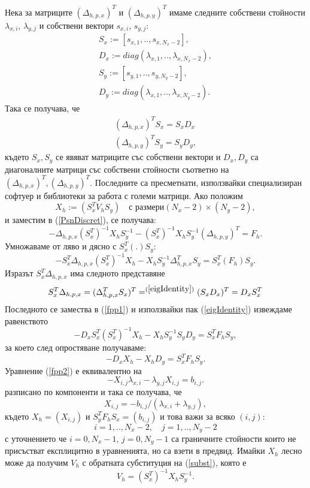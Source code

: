 \documentclass[a4paper]{article}
\newcommand{\be}{\begin{equation}}
\newcommand{\ee}{\end{equation}}
\newcommand{\rf}[1]{(\ref{#1})}
\theoremstyle{remark}
\begin{document}
\begin{large}
Нека за матриците $(\Delta_{h,p,x})^T$ и $(\Delta_{h,p,y})^T$ имаме следните собствени стойности $\lambda_{x,i}$, $\lambda_{y,j}$ и собствени вектори $s_{x,i}$, $s_{y,j}$:
\begin{align}
S_x:=[s_{x,1},..,s_{x,N_x-2}],\\
D_x:= diag(\lambda_{x,1},..,\lambda_{x,N_x-2}),\\
S_y:=[s_{y,1},..,s_{y,N_y-2}],\\
D_y:= diag(\lambda_{x,1},..,\lambda_{x,N_y-2}).
\end{align}
Така се получава, че
\begin{align}\label{eigIdentity}
(\Delta_{h,p,x})^T  S_x = S_x  D_x\nonumber\\
(\Delta_{h,p,y})^T   S_y = S_y  D_y,
\end{align}
където $S_x, S_y$ се явяват матриците със собствени вектори и $D_x, D_y$ са диагоналните матрици със собствени стойности съответно на $(\Delta_{h,p,x})^T, (\Delta_{h,p,y})^T$. Последните са пресметнати, използвайки специализиран софтуер и библиотеки за работа с големи матрици. Ако положим
\be\label{subst}
X_h := ( S_x^T  V_h  S_y ) \quad \text{с размери} (N_x-2)\times(N_y-2),
\ee
и заместим в \rf{PsnDiscret}, се получава:
\be
-\Delta_{h,p,x}  (S_x^T)^{-1} X_h  S_y^{-1}  -(S_x^T)^{-1} X_h  S_y^{-1}  (\Delta_{h,p,y})^T = F_h.
\ee
Умножаваме от ляво и дясно с $ S_x^T  ( . )  S_y$:
\be\label{fpp1}
- S_x^T \Delta_{h,p,x} (S_x^T)^{-1} X_h -X_h  S_y^{-1}  \Delta_{h,p,x}^T  S_y = S_x^T  ( F_h )  S_y.
\ee
Изразът $S_x^T  \Delta_{h,p,x}$ има следното представяне
\be
S_x^T  \Delta_{h,p,x} = (\Delta_{h,p,x}^T  S_x)^T =^{\rf{eigIdentity}} (S_x  D_x)^T = D_x  S_x^T
\ee
Последното се замества в \rf{fpp1} и използвайки пак \rf{eigIdentity} извеждаме равенството
\be
- D_x  S_x^T (S_x^T)^{-1} X_h  -X_h  S_y^{-1}  S_y  D_y = S_x^T  F_h   S_y,
\ee
за което след опростяване получаваме:
\be\label{fpp2}
- D_x  X_h -X_h  D_y = S_x^T  F_h  S_y.
\ee
Уравнение \rf{fpp2} е еквивалентно на
\be\label{fpp3}
-X_{i,j} \lambda_{x,i} - \lambda_{y,j} X_{i,j} = b_{i,j}.
\ee
разписано по компоненти и така се получава, че
\be\label{fpp4}
X_{i,j} = - b_{i,j}/(\lambda_{x,i} + \lambda_{y,j} ),
\ee
където $X_h = (X_{i,j})$ и $S_y^T  F_h   S_x = (b_{i,j})$ и това важи за всяко $(i,j)$:
$$i = 1,..,N_x-2, \quad j = 1,..,N_y-2 $$
с уточнението че $i = 0,N_x-1$, $j = 0,N_y-1$ са граничните стойности които не присъстват експлицитно в уравненията, но са взети в предвид. Имайки $X_h$ лесно може да получим $V_h$  с обратната субституция на \rf{subst}, която е 
\be\label{substInv}
V_h = (S_x^T)^{-1}  X_h  S_y^{-1}.
\ee


\end{large}
\end{document}
